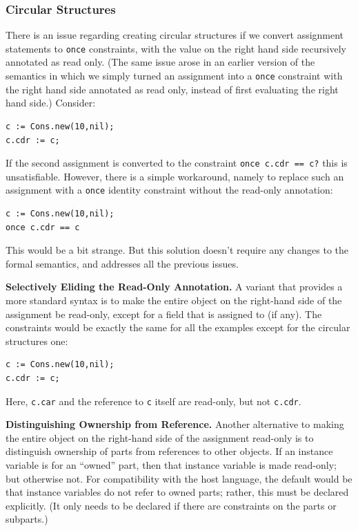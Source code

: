 \documentclass{article}
\begin{document}
\subsubsection{Circular Structures}
\label{sec:circular-structures}

There is an issue regarding creating circular structures if we convert
assignment statements to \verb|once| constraints, with the value on
the right hand side recursively annotated as read only.  (The same
issue arose in an earlier version of the semantics in which we simply
turned an assignment into a \verb|once| constraint with the right hand
side annotated as read only, instead of first evaluating the right
hand side.)  Consider:
\begin{verbatim}
c := Cons.new(10,nil);
c.cdr := c;
\end{verbatim}

If the second assignment is converted to the constraint
\verb|once c.cdr == c?| this is unsatisfiable.  However, there is a
simple workaround, namely to replace such an assignment with a
\verb|once| identity constraint without the read-only annotation:
\begin{verbatim}
c := Cons.new(10,nil);
once c.cdr == c
\end{verbatim}

This would be a bit strange.  But this solution doesn't require any
changes to the formal semantics, and addresses all the previous
issues. 

{\bf Selectively Eliding the Read-Only Annotation.}
A variant that provides a more standard syntax is to make the entire
object on the right-hand side of the assignment be read-only, except
for a field that is assigned to (if any).  The constraints would be
exactly the same for all the examples except for the circular
structures one:

\begin{verbatim}
c := Cons.new(10,nil);
c.cdr := c;
\end{verbatim}

Here, \verb|c.car| and the reference to \verb|c| itself are read-only, but not
\verb|c.cdr|.

{\bf Distinguishing Ownership from Reference.}  Another alternative to
making the entire object on the right-hand side of the assignment
read-only is to distinguish ownership of parts from references to
other objects.  If an instance variable is for an ``owned'' part, then
that instance variable is made read-only; but otherwise not.  For
compatibility with the host language, the default would be that
instance variables do not refer to owned parts; rather, this must be
declared explicitly.  (It only needs to be declared if there are
constraints on the parts or subparts.)
\end{document}
